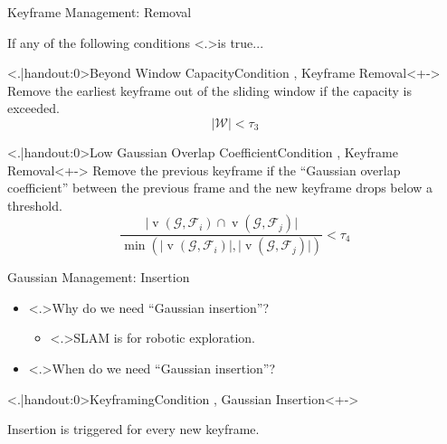 \begin{Frame}{Keyframe Management: Removal}
	\begin{overprint}[\textheight]
		\par If \alert<+>{any} of the following conditions \alert<.>{is true}...
		\vspace*{\fill}
		\begin{block}{\alert<.|handout:0>{Beyond Window Capacity}\hfill Condition , Keyframe Removal}<+->
			Remove the earliest keyframe out of the sliding window if the capacity is exceeded.
			\begin{equation}
				\vert \mathcal{W} \vert < \tau_3
			\end{equation}
		\end{block}
		\vspace*{\fill}
		\begin{block}{\alert<.|handout:0>{Low Gaussian Overlap Coefficient}\hfill Condition , Keyframe Removal}<+->
			Remove the previous keyframe if the ``Gaussian overlap coefficient'' between the previous frame and the new keyframe drops below a threshold.
			\begin{equation}
				\frac{\vert \operatorname{v}\left(\mathcal{G}, \mathcal{F}_{i}\right) \cap \operatorname{v}\left(\mathcal{G}, \mathcal{F}_{j}\right) \vert}{\min \left(\vert\operatorname{v}\left(\mathcal{G}, \mathcal{F}_{i}\right) \vert, \vert\operatorname{v}\left(\mathcal{G}, \mathcal{F}_{j}\right) \vert\right)} < \tau_4
			\end{equation}
		\end{block}
	\end{overprint}
\end{Frame}

\begin{Frame}{Gaussian Management: Insertion}
	\begin{itemize}
		\setlength{\itemsep}{1.5ex}
		\item<+-> \alert<.>{Why} do we need ``Gaussian insertion''?
			\vspace*{1.5ex}
			\begin{itemize}
				\setlength{\itemsep}{1.5ex}
				\item<+-> \alert<.>{SLAM} is for robotic exploration.
			\end{itemize}
	\end{itemize}
	\vspace*{\fill}
	\begin{itemize}
		\setlength{\itemsep}{1.5ex}
		\item<+-> \alert<.>{When} do we need ``Gaussian insertion''?
	\end{itemize}
	\begin{block}{\alert<.|handout:0>{Keyframing}\hfill Condition , Gaussian Insertion}<+->
		\par Insertion is triggered for every new keyframe.
	\end{block}
\end{Frame}

